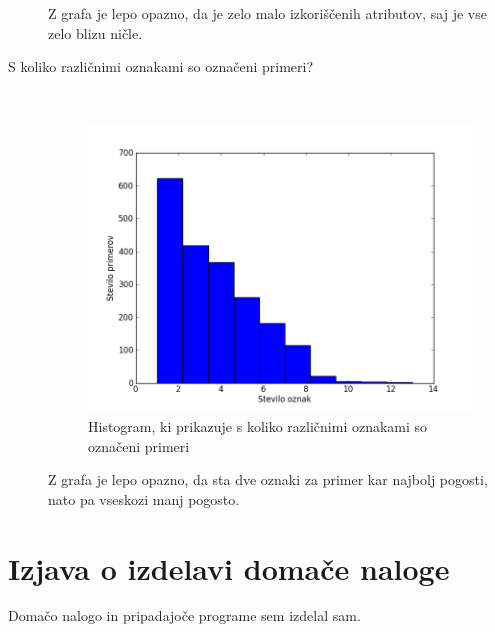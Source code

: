\documentclass[a4paper,11pt]{article}
\begin{document}
\begin{description}
Z grafa je lepo opazno, da je zelo malo izkoriščenih atributov, saj je vse zelo blizu ničle.

\pagebreak
\item[S koliko različnimi oznakami so označeni primeri?] \hfill \\
\begin{figure}[h!]
\begin{center}
\includegraphics[scale=0.5]{statRazredi.png}
\caption{Histogram, ki prikazuje s koliko različnimi oznakami so označeni primeri}
\label{slika3}
\end{center}
\end{figure}

Z grafa je lepo opazno, da sta dve oznaki za primer kar najbolj pogosti, nato pa vseskozi manj pogosto. 

\end{description}

\pagebreak

\section{Izjava o izdelavi domače naloge}
Domačo nalogo in pripadajoče programe sem izdelal sam.
\end{document}
